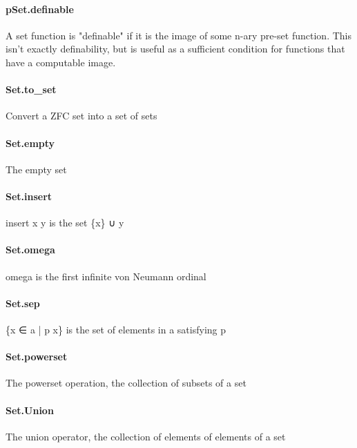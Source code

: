 \documentclass{article}
\begin{document}
\paragraph{pSet.definable}
\par
A set function is "definable" if it is the image of some n-ary pre-set
function. This isn't exactly definability, but is useful as a sufficient
condition for functions that have a computable image.
\paragraph{Set.to\_set}
\par
Convert a ZFC set into a 
\colorbox[RGB]{253,246,227}{{{{\color[RGB]{101, 123, 131} set }}}} of sets
\paragraph{Set.empty}
\par
The empty set
\paragraph{Set.insert}
\par
\colorbox[RGB]{253,246,227}{{{{\color[RGB]{101, 123, 131} insert x y }}}} is the set 
\colorbox[RGB]{253,246,227}{{{{\color[RGB]{101, 123, 131} \{x\} ∪ y }}}}\paragraph{Set.omega}
\par
\colorbox[RGB]{253,246,227}{{{{\color[RGB]{101, 123, 131} omega }}}} is the first infinite von Neumann ordinal
\paragraph{Set.sep}
\par
\colorbox[RGB]{253,246,227}{{{{\color[RGB]{101, 123, 131} \{x ∈ a | p x\} }}}} is the set of elements in 
\colorbox[RGB]{253,246,227}{{{{\color[RGB]{101, 123, 131} a }}}} satisfying 
\colorbox[RGB]{253,246,227}{{{{\color[RGB]{101, 123, 131} p }}}}\paragraph{Set.powerset}
\par
The powerset operation, the collection of subsets of a set
\paragraph{Set.Union}
\par
The union operator, the collection of elements of elements of a set
\end{document}
